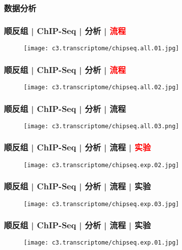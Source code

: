 \subsubsection{数据分析}
\begin{frame}
  \frametitle{顺反组 | ChIP-Seq | 分析 | \textcolor{red}{流程}}
  \begin{figure}
    \centering
    \texttt{[image: c3.transcriptome/chipseq.all.01.jpg]}
  \end{figure}
\end{frame}

\begin{frame}
  \frametitle{顺反组 | ChIP-Seq | 分析 | \textcolor{red}{流程}}
  \begin{figure}
    \centering
    \texttt{[image: c3.transcriptome/chipseq.all.02.jpg]}
  \end{figure}
\end{frame}

\begin{frame}
  \frametitle{顺反组 | ChIP-Seq | 分析 | 流程}
  \begin{figure}
    \centering
    \texttt{[image: c3.transcriptome/chipseq.all.03.png]}
  \end{figure}
\end{frame}

\begin{frame}
  \frametitle{顺反组 | ChIP-Seq | 分析 | 流程 | \textcolor{red}{实验}}
  \begin{figure}
    \centering
    \texttt{[image: c3.transcriptome/chipseq.exp.02.jpg]}
  \end{figure}
\end{frame}

\begin{frame}
  \frametitle{顺反组 | ChIP-Seq | 分析 | 流程 | 实验}
  \begin{figure}
    \centering
    \texttt{[image: c3.transcriptome/chipseq.exp.03.jpg]}
  \end{figure}
\end{frame}

\begin{frame}
  \frametitle{顺反组 | ChIP-Seq | 分析 | 流程 | 实验}
  \begin{figure}
    \centering
    \texttt{[image: c3.transcriptome/chipseq.exp.01.jpg]}
  \end{figure}
\end{frame}

